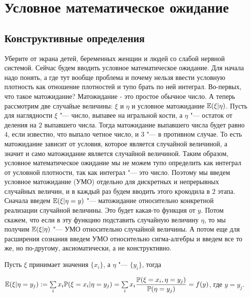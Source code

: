 \documentclass[../TV&MS.tex]{subfiles}
\begin{document}
\section{Условное математическое ожидание}

\subsection{Конструктивные определения}

\begin{Why}
    Уберите от экрана детей, беременных женщин и людей со слабой нервной системой.
Сейчас будем вводить условное математическое ожидание.
Для начала надо понять, а где тут вообще проблема и почему нельзя ввести условную плотность как отношение плотностей и тупо брать по ней интеграл.
Во-первых, что такое матожидание?
Матожидание - это простое обычное число.
А теперь рассмотрим две случайые величины: $\xi$ и $\eta$ и условное матожидание $\mathbb{E}(\xi|\eta)$.
Пусть для наглядности $\xi$ "--- число, выпавее на игральной кости, а $\eta$
"--- остаток от деления на $2$ выпавшего числа.
Тогда матожидание выпавшего числа будет равно $4$, если известно, что выпало
четное число, и $3$ "--- в противном случае.
То есть матожидание зависит от условия, которое является случайной величиной, 
а значит и само матожидание является случайной величиной.
Таким образом, условное математическое ожидание мы не можем тупо определить как интеграл от условной плотности, так как интеграл "--- это число.
Поэтому мы введем условное матожидание (УМО) отдельно для дискретных и непрерывных случайных величин, и в каждый раз будем вводить этого крокодила в $2$ этапа.
Сначала введем $\mathbb{E}(\xi | \eta = y)$ "--- матожидание относительно конкретной реализации случайной величины.
Это будет какая-то функция от $y$.
Потом скажем, что если в эту функцию подставить случайную величину $\eta$, то мы получим $\mathbb{E}(\xi | \eta)$ "--- УМО относительно случайной величины.
А потом еще для расширения сознания введем УМО относительно сигма-алгебры и введем все то же, но по-другому, аксиоматически, а не конструктивно.
\end{Why}

Пусть $\xi$ принимает значения $\{x_i\}$, а $\eta$ "--- $\{y_i\}$, тогда

\begin{Def}
    $
        \mathbb{E}(\xi | \eta = y_j) := 
        \sum\limits_{i} x_i \mathbb{P}(\xi = x_i | \eta = y_j) =
        \sum\limits_{i} x_i \dfrac{\mathbb{P}(\xi = x_i, \eta = y_j)}{\mathbb{P}(\eta = y_j)} = 
        f(y)$, \quad где $y = y_j.$
\end{Def} 
\end{document}
